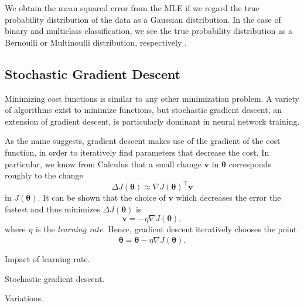 We obtain the mean squared error from the MLE if we regard the true probability distribution of the data as a Gaussian distribution. In the case of binary and multiclass classification, we see the true probability distribution as a Bernoulli or Multinoulli distribution, respectively \cite[ Ch.\,6,\,pp.\,175-185]{DBLP:books/daglib/0040158}.

\subsection{Stochastic Gradient Descent}
Minimizing cost functions is similar to any other minimization problem. A variety of algorithms exist to minimize functions, but stochastic gradient descent, an extension of gradient descent, is particularly dominant in neural network training.

As the name suggests, gradient descent makes use of the gradient of the cost function, in order to iteratively find parameters that decrease the cost. In particular, we know from Calculus that a small change $\bm{v}$ in $\bm{\theta}$ corresponds roughly to the change
\begin{equation}
\Delta J(\bm{\theta}) \approx \nabla J(\bm{\theta})^{\top}\bm{v}
\end{equation}
in $J(\bm{\theta})$. It can be shown that the choice of $\bm{v}$ which decreases the error the fastest and thus minimizes $\Delta J(\bm{\theta})$ is
\begin{equation}
\bm{v} = -\eta\nabla J(\bm{\theta}),
\end{equation}
where $\eta$ is the \emph{learning rate}. Hence, gradient descent iteratively chooses the point
\begin{equation}
\bar{\bm{\theta}} = \bm{\theta} - \eta\nabla J(\bm{\theta}).
\end{equation}

Impact of learning rate.

Stochastic gradient descent.

Variations.

\begin{comment}
Applying the Cauchy-Schwarz inequality, we obtain
\begin{equation}\label{eq:cauchy-schwarz}
-\lVert\nabla J(\bm{\theta})\rVert\lVert v\rVert \leq
\nabla J(\bm{\theta})^{\top}\bm{v} \leq
\lVert\nabla J(\bm{\theta})\rVert\lVert v\rVert.
\end{equation}
We observe that, if we set $\bm{v} = -\eta\nabla J(\bm{\theta})$, then
\begin{equation}
\nabla J(\bm{\theta})^{\top}\bm{v} = -\eta\lVert\nabla J(\bm{\theta})\rVert^2,
\end{equation}
which is exactly the left-hand side of Eq. \eqref{eq:cauchy-schwarz}. Thus, in order to minimize $\Delta J(\bm{\theta})$, we can choose new parameters $\bar{\bm{\theta}}$ with the update rule
\begin{equation}
\bar{\bm{\theta}} = \bm{\theta} - \eta\nabla J(\bm{\theta}),
\end{equation}
\end{comment}

